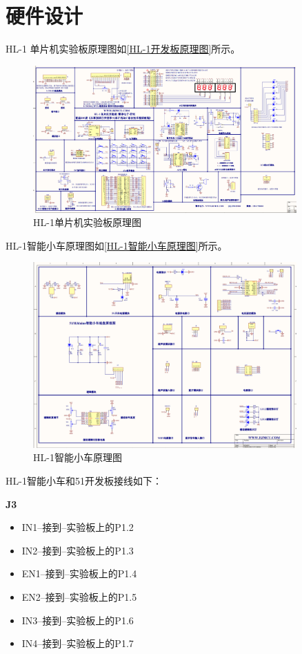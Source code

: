 \section{硬件设计}
HL-1 单片机实验板原理图如\autoref{HL-1开发板原理图}所示。
\begin{figure}[!htbp]
    \centering
    \includegraphics[width =0.9\textwidth]{figures/开发板原理图.png}
    \caption{HL-1单片机实验板原理图}
    \label{HL-1开发板原理图}
\end{figure}
\newline

HL-1智能小车原理图如\autoref{HL-1智能小车原理图}所示。
\begin{figure}[!htbp]
    \centering
    \includegraphics[width =0.9\textwidth]{figures/智能小车原理图.png}
    \caption{HL-1智能小车原理图}
    \label{HL-1智能小车原理图}
\end{figure}
\newline

HL-1智能小车和51开发板接线如下：

\textbf{J3}
\begin{itemize}
    \item IN1--接到--实验板上的P1.2
    \item IN2--接到--实验板上的P1.3
    \item EN1--接到--实验板上的P1.4
    \item EN2--接到--实验板上的P1.5
    \item IN3--接到--实验板上的P1.6
    \item IN4--接到--实验板上的P1.7
\end{itemize}

